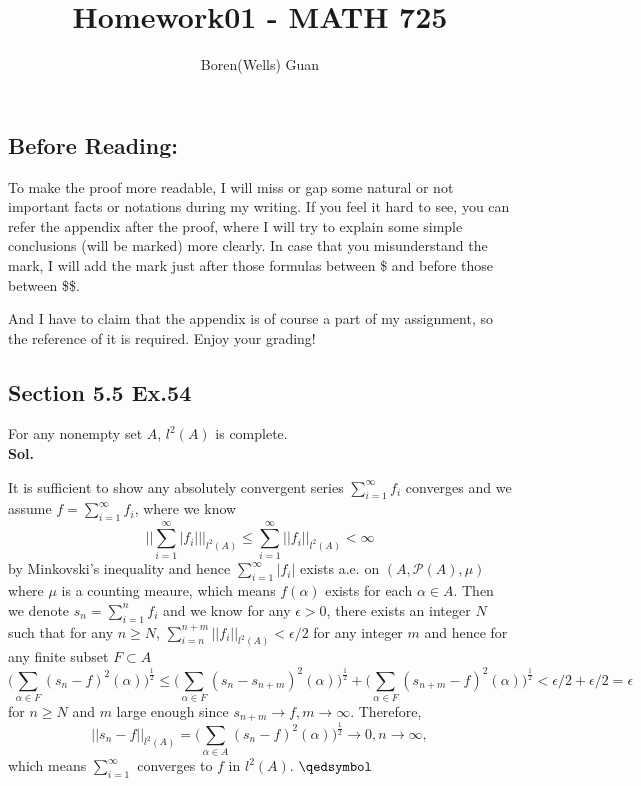 \documentclass[lang=en,11pt,a4paper,citestyle =authoryear]{elegantpaper}
\title{Homework01 - MATH 725}
\author{Boren(Wells) Guan}
\newcommand{\prvd}{$\hfill \qedsymbol$}
\begin{document}
\maketitle

\subsection*{Before Reading:}\par
To make the proof more readable, I will miss or gap some natural or not important facts or notations during my writing. If you feel it hard to see, you can refer the appendix after the proof, where I will try to explain some simple conclusions (will be marked) more clearly. In case that you misunderstand the mark, I will add the mark just after those formulas between \$ and before those between \$\$.\par
And I have to claim that the appendix is of course a part of my assignment, so the reference of it is required. Enjoy your grading!

\subsection*{Section 5.5 Ex.54} 
For any nonempty set $A$, $l^2(A)$ is complete.
\vspace{0.5em}\\
\textbf{Sol.} \par
It is sufficient to show any absolutely convergent series $\sum\limits_{i=1}^{\infty} f_i$ converges and we assume $f = \sum\limits_{i=1}^{\infty} f_i$, where we know
\[||\sum\limits_{i=1}^{\infty}|f_i|||_{l^2(A)}\leq \sum\limits_{i=1}^{\infty} ||f_i||_{l^2(A)} < \infty\]
by Minkovski's inequality and hence $\sum\limits_{i=1}^{\infty} |f_i|$ exists a.e. on $(A,\mathcal{P}(A),\mu)$ where $\mu$ is a counting meaure, which means $f(\alpha)$ exists for each $\alpha \in A$. Then we denote $s_n = \sum\limits_{i=1}^n f_i$ and we know for any $\epsilon > 0$, there exists an integer $N$ such that for any $n \geq N$, $\sum\limits_{i=n}^{n+m}||f_i||_{l^2(A)}<\epsilon/2$ for any integer $m$ and hence for any finite subset $F\subset A$
\[\Big(\sum_{\alpha \in F} (s_n-f)^2(\alpha)\Big)^{\tfrac{1}{2}} \leq \Big(\sum_{\alpha \in F} (s_n-s_{n+m})^2(\alpha)\Big)^{\tfrac{1}{2}}+\Big(\sum_{\alpha \in F} (s_{n+m}-f)^2(\alpha)\Big)^{\tfrac{1}{2}} < \epsilon/2 + \epsilon/2 = \epsilon\]
for $n\geq N$ and $m$ large enough since $s_{n+m} \to f, m \to\infty$. Therefore, 
\[||s_n-f||_{l^2(A)} = \Big(\sum\limits_{\alpha \in A}(s_n-f)^2(\alpha)\Big)^{\tfrac{1}{2}} \to 0, n\to\infty,\]
which means $\sum\limits_{i=1}^{\infty}$ converges to $f$ in $l^2(A)$.
\prvd
\vspace{0.5em}
\end{document}
